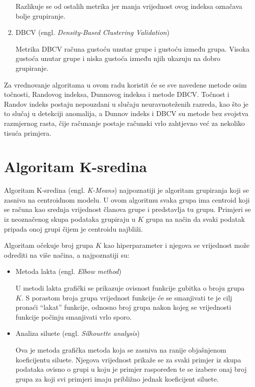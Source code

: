\documentclass[utf8, diplomski, numeric]{fer}
\begin{document}
\begin{enumerate}
Razlikuje se od ostalih metrika jer manja vrijednost ovog indeksa označava bolje grupiranje.

\item DBCV (engl. \textit{Density-Based Clustering Validation})

Metrika DBCV računa gustoću unutar grupe i gustoću između grupa. Visoka gustoća unutar grupe i niska gustoća između njih ukazuju na dobro grupiranje.

\end{enumerate}

Za vrednovanje algoritama u ovom radu koristit će se sve navedene metode osim točnosti, Randovog indeksa, Dunnovog indeksa i metode DBCV. Točnost i Randov indeks postaju nepouzdani u slučaju neuravnoteženih razreda, kao što je to slučaj u detekciji anomalija, a Dunnov indeks i DBCV su metode bez svojstva razmjernog rasta, čije računanje postaje računski vrlo zahtjevno već za nekoliko tisuća primjera.

\section{Algoritam K-sredina}
Algoritam K-sredina (engl. \textit{K-Means}) najpoznatiji je algoritam grupiranja koji se zasniva na centroidnom modelu. U ovom algoritmu svaka grupa ima centroid koji se računa kao srednja vrijednost članova grupe i predstavlja tu grupu. Primjeri se iz neoznačenog skupa podataka grupiraju u $K$ grupa na način da svaki podatak pripada onoj grupi čijem je centroidu najbliži. 

Algoritam očekuje broj grupa $K$ kao hiperparameter i njegova se vrijednost može odrediti na više načina, a najpoznatiji su:
\begin{itemize}
\item Metoda lakta (engl. \textit{Elbow method})

U metodi lakta grafički se prikazuje ovisnost funkcije gubitka o broju grupa $K$. S porastom broja grupa vrijednost funkcije će se smanjivati te je cilj pronaći ``lakat'' funkcije, odnosno broj grupa nakon kojeg se vrijednosti funkcije počinju smanjivati vrlo sporo.

\item Analiza siluete (engl. \textit{Silhouette analysis})

Ova je metoda grafička metoda koja se zasniva na ranije objašnjenom koeficijentu siluete. Njegova vrijednost prikaže se za svaki primjer iz skupa podataka ovisno o grupi u koju je primjer raspoređen te se izabere onaj broj grupa za koji svi primjeri imaju približno jednak koeficijent siluete.
\end{itemize}
\end{document}
